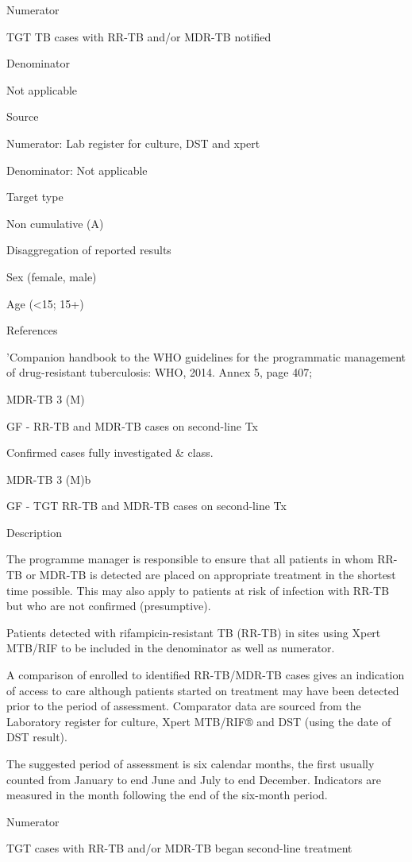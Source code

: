 \documentclass[]{book}
\begin{document}
Numerator

TGT TB cases with RR-TB and/or MDR-TB notified

Denominator

Not applicable

Source

Numerator: Lab register for culture, DST and xpert

Denominator: Not applicable

Target type

Non cumulative (A)

Disaggregation of reported results

Sex (female, male)

Age (\textless{}15; 15+)

References

'Companion handbook to the WHO guidelines for the programmatic management of drug-resistant tuberculosis: WHO, 2014. Annex 5, page 407;

MDR-TB 3 (M)

GF - RR-TB and MDR-TB cases on second-line Tx

Confirmed cases fully investigated \& class.

MDR-TB 3 (M)b

GF - TGT RR-TB and MDR-TB cases on second-line Tx

Description

The programme manager is responsible to ensure that all patients in whom RR-TB or MDR-TB is detected are placed on appropriate treatment in the shortest time possible. This may also apply to patients at risk of infection with RR-TB but who are not confirmed (presumptive).

Patients detected with rifampicin-resistant TB (RR-TB) in sites using Xpert MTB/RIF to be included in the denominator as well as numerator.

A comparison of enrolled to identified RR-TB/MDR-TB cases gives an indication of access to care although patients started on treatment may have been detected prior to the period of assessment. Comparator data are sourced from the Laboratory register for culture, Xpert MTB/RIF® and DST (using the date of DST result).

The suggested period of assessment is six calendar months, the first usually counted from January to end June and July to end December. Indicators are measured in the month following the end of the six-month period.

Numerator

TGT cases with RR-TB and/or MDR-TB began second-line treatment
\end{document}
